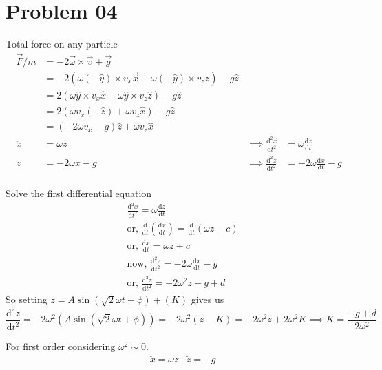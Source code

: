 \documentclass[letter, 10pts]{article}
\begin{document}
\section*{Problem 04} 
Total force on any particle
\begin{align*}
\vec{F}/m &= - 2 \vec{\omega} \times \vec{v} +  \vec{g}  \\
&= - 2 (\omega (-\hat{y}) \times v_x \vec{x} + \omega (- \hat{y})\times v_z \hat{z}) -  g \hat{z} \\
&= 2 (\omega \hat{y} \times v_x \hat{x} + \omega \hat{y}\times v_z \hat{z}) -  g \hat{z} \\
&= 2 (\omega v_x (- \hat{z}) + \omega v_z \hat{x}) -  g \hat{z} \\
&= 
\left(- 2 \omega v_x - g \right) \hat{z} + \omega v_z \hat{x}
\\
\ddot{x} &= \omega \dot{z} &\implies \frac{\mathrm{d} ^2 x}{\mathrm{d} t^2} &= \omega \frac{\mathrm{d} z}{\mathrm{d} t}  \\ 
\ddot{z} &= - 2 \omega \dot{x} - g
	 & \implies \frac{\mathrm{d} ^2 z}{\mathrm{d} t^2} &= - 2 \omega \frac{\mathrm{d} x}{\mathrm{d} t} - g \\
\end{align*}

Solve the first differential equation 
\begin{align*}
&\frac{\mathrm{d} ^2x}{\mathrm{d} t^2} = \omega \frac{\mathrm{d} z}{\mathrm{d} t} \\
				      &\text{or, }\frac{\mathrm{d} }{\mathrm{d} t} 
\left(
\frac{\mathrm{d} x}{\mathrm{d} t} 
\right)= 
\frac{\mathrm{d} }{\mathrm{d} t} \left(\omega z + c\right)
				    \\&
\text{or, } 
	\frac{\mathrm{d} x}{\mathrm{d} t} = \omega z + c \\ &
\text{now, } 
\frac{\mathrm{d} ^2 z}{\mathrm{d} t^2} = - 2 \omega \frac{\mathrm{d} x}{\mathrm{d} t} - g
							 \\ &
							\text{or, }
							\frac{\mathrm{d} ^2 z}{\mathrm{d} t^2 } = - 2 \omega^2 z -g + d
\end{align*} 
So setting $z = A \sin(\sqrt{2}  \omega t + \phi) + (K)$ gives us
\[
\frac{\mathrm{d} ^2 z}{\mathrm{d} t^2} = - 2 \omega^2 \left(A \sin (\sqrt{2}  \omega t + \phi)\right)  = -2 \omega^2 (z - K) = - 2 \omega ^2 z + 2 \omega ^2 K \implies K = \frac{-g + d}{2 \omega^2}
\] 

For first order considering $\omega^2 \sim  0$. 
\begin{align*}
&\ddot{x} = \omega \dot{z} &\ddot{z} = - g
\end{align*}
\end{document}
